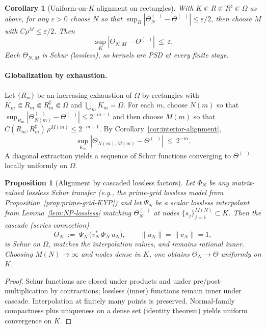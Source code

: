 \documentclass[11pt]{article}
\newtheorem{proposition}[theorem]{Proposition}
\newtheorem{corollary}[theorem]{Corollary}
\theoremstyle{definition}
\theoremstyle{remark}
\DeclareMathOperator{\dettwo}{det_2}
\begin{document}
\begin{corollary}[Uniform-on-$K$ alignment on rectangles]\label{prop:alignment-criterion}
With \(K\Subset R\Subset R^\sharp\Subset\Omega\) as above, for any \(\varepsilon>0\) choose \(N\) so that \(\sup_R|\Theta_N^{(\dettwo)}-\Theta^{(\dettwo)}|\le \varepsilon/2\), then choose \(M\) with \(C\rho^M\le \varepsilon/2\). Then
\[
 \sup_{K}|\Theta_{N,M}-\Theta^{(\dettwo)}|\ \le\ \varepsilon.
\]
Each \(\Theta_{N,M}\) is Schur (lossless), so kernels are PSD at every finite stage.
\end{corollary}

\paragraph{Globalization by exhaustion.}
Let \(\{R_m\}\) be an increasing exhaustion of \(\Omega\) by rectangles with \(K_m\Subset R_m\Subset R_m^\sharp\Subset\Omega\) and \(\bigcup_m K_m=\Omega\). For each \(m\), choose \(N(m)\) so that \(\sup_{R_m}|\Theta_{N(m)}^{(\dettwo)}-\Theta^{(\dettwo)}|\le 2^{-m-1}\) and then choose \(M(m)\) so that \(C(R_m,R_m^\sharp)\,\rho^{M(m)}\le 2^{-m-1}\). By Corollary~\ref{cor:interior-alignment},
\[
 \sup_{K_m}|\Theta_{N(m),M(m)}-\Theta^{(\dettwo)}|\ \le\ 2^{-m}.
\]
A diagonal extraction yields a sequence of Schur functions converging to \(\Theta^{(\dettwo)}\) locally uniformly on \(\Omega\).
\begin{proposition}[Alignment by cascaded lossless factors]\label{prop:cascade}
Let \(\Phi_N\) be any matrix-valued lossless Schur transfer (e.g., the prime-grid lossless model from Proposition~\ref{prop:prime-grid-KYP}) and let \(\Psi_N\) be a scalar lossless interpolant from Lemma~\ref{lem:NP-lossless} matching \(\Theta_N^{(\dettwo)}\) at nodes \(\{s_j\}_{j=1}^{M(N)}\subset K\). Then the cascade (series connection)
\[
 \Theta_N\;:=\;\Psi_N\,\big(v_N^*\,\Phi_N\,u_N\big),\qquad \|u_N\|=\|v_N\|=1,
\]
is Schur on \(\Omega\), matches the interpolation values, and remains rational inner. Choosing \(M(N)\to\infty\) and nodes dense in \(K\), one obtains \(\Theta_N\to \Theta\) uniformly on \(K\).
\end{proposition}
\begin{proof}
Schur functions are closed under products and under pre/post-multiplication by contractions; lossless (inner) functions remain inner under cascade. Interpolation at finitely many points is preserved. Normal-family compactness plus uniqueness on a dense set (identity theorem) yields uniform convergence on \(K\).
\end{proof}
\end{document}
